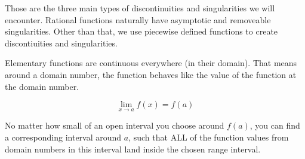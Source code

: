 \documentclass{ximera}
\begin{document}
\begin{example}
\begin{image}
\end{image}





\end{example}







Those are the three main types of discontinuities and singularities we will encounter.  Rational functions naturally have asymptotic and removeable singularities.  Other than that, we use piecewise defined functions to create discontiuities and singularities.

Elementary functions are continuous everywhere (in their domain).  That means around a domain number, the function behaves like the value of the function at the domain number.


\[      \lim_{x \to a} f(x) = f(a)                   \]



No matter how small of an open interval you choose around $f(a)$, you can find a corresponding interval around $a$, such that ALL of the function values from domain numbers in this interval land inside the chosen range interval.
\end{document}
